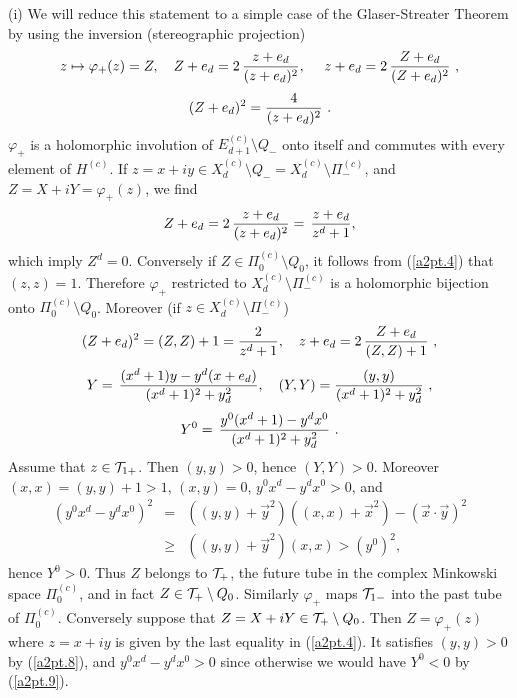 \documentclass[a4paper,a4paper]{article}
\def\TT{{\cal T}}
\def \vhi{\varphi}
\def\HB{\hfill\break}
\def\Xcd{X_d^{(c)}}
\def\amb{E_{d+1}}
\def\ambc{\amb^{(c)}}
\begin{document}
\HB
(i) We will reduce this statement to a simple case of the
Glaser-Streater Theorem \cite{Sr,J} by using the inversion
(stereographic projection)
\begin{equation}
 z \mapsto \vhi_+(z) = Z,\ \ \
Z+e_d = 2\, {z + e_d \over (z + e_d)^2},\ \ \ \
z+e_d = 2\, {Z + e_d \over (Z + e_d)^2}\ ,
\label{a2pt.4}\end{equation}
\begin{equation}
(Z+e_d)^2 = {4 \over(z+e_d)^2}\ .
\label{a2pt.5}\end{equation}
$\vhi_+$ is a holomorphic involution of $\ambc \setminus Q_-$ onto
itself and commutes with
every element of $H^{(c)}$. If
$z = x+iy \in \Xcd \setminus Q_- = \Xcd \setminus \Pi_-^{(c)}$,
and $Z = X+iY = \vhi_+(z)$, we find
\begin{equation}
Z+e_d = 2\,{z+e_d \over (z+e_d)^2} = \,{z+e_d \over z^d + 1},
\label{a2pt.6}\end{equation}
which imply $Z^d = 0$. Conversely if $Z \in \Pi_0^{(c)} \setminus Q_0$,
it follows from (\ref{a2pt.4}) that $(z,z) = 1$.
Therefore $\vhi_+$ restricted to
$\Xcd \setminus \Pi_-^{(c)}$ is a holomorphic bijection
onto $\Pi_0^{(c)} \setminus Q_0$. Moreover
(if $z \in \Xcd \setminus \Pi_-^{(c)}$)
\begin{equation}
(Z+e_d)^2 = (Z,Z)+1 = {2\over z^d +1},\ \ \
z+e_d = 2\,{Z+e_d \over (Z,Z)+1}\ ,
\label{a2pt.7}\end{equation}
\begin{equation}
Y = \,{(x^d + 1)y - y^d(x+e_d) \over (x^d +1)^2 + y_d^2},\ \ \
(Y,Y) = {(y,y) \over (x^d +1)^2 + y_d^2}\ ,
\label{a2pt.8}\end{equation}
\begin{equation}
Y^0 = \,{y^0(x^d+1) - y^d x^0 \over (x^d +1)^2 + y_d^2}\ .
\label{a2pt.9}\end{equation}
Assume that $z \in \TT_{1+}$. Then $(y,y) > 0$, hence $(Y,Y) >0$.
Moreover $(x,x) = (y,y)+1 >1$, $(x,y) = 0$, $y^0 x^d - y^d x^0 > 0$, and
\begin{eqnarray}
(y^0 x^d - y^d x^0)^2 &=& ((y,y)+\vec{y}^2)((x,x)+\vec{x}^2) -
(\vec{x}\cdot\vec{y})^2\nonumber\\
&\ge& ((y,y)+\vec{y}^2)(x,x) > (y^0)^2,
\label{a2pt.10}\end{eqnarray}
hence $Y^0 > 0$. Thus $Z$ belongs to $\TT_+$,
the future tube in the complex Minkowski space $\Pi_0^{(c)}$,
and in fact $Z \in \TT_+ \setminus Q_0$.
Similarly $\vhi_+$ maps $\TT_{1-}$ into the past
tube of $\Pi_0^{(c)}$. Conversely suppose that
$Z = X+iY \in \TT_+ \setminus Q_0$. Then $Z = \vhi_+(z)$ where
$z = x+iy$ is given by the last equality in (\ref{a2pt.4}). It satisfies
$(y,y) >0$ by (\ref{a2pt.8}), and $y^0x^d - y^d x^0 >0$ since otherwise
we would have $Y^0 < 0$ by (\ref{a2pt.9}).
\end{document}
